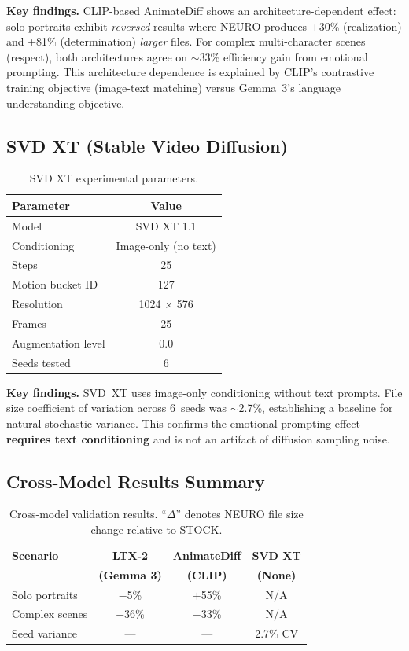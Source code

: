 \documentclass[10pt,twocolumn,letterpaper]{article}
\begin{document}
\textbf{Key findings.} CLIP-based AnimateDiff shows an architecture-dependent effect: solo portraits exhibit \emph{reversed} results where NEURO produces +30\% (realization) and +81\% (determination) \emph{larger} files. For complex multi-character scenes (respect), both architectures agree on $\sim$33\% efficiency gain from emotional prompting. This architecture dependence is explained by CLIP's contrastive training objective (image-text matching) versus Gemma~3's language understanding objective.

\subsection{SVD XT (Stable Video Diffusion)}

\begin{table}[h]
\centering
\small
\caption{SVD XT experimental parameters.}
\label{tab:svd_params}
\begin{tabular}{lc}
\toprule
\textbf{Parameter} & \textbf{Value} \\
\midrule
Model & SVD XT 1.1 \\
Conditioning & Image-only (no text) \\
Steps & 25 \\
Motion bucket ID & 127 \\
Resolution & 1024 $\times$ 576 \\
Frames & 25 \\
Augmentation level & 0.0 \\
Seeds tested & 6 \\
\bottomrule
\end{tabular}
\end{table}

\textbf{Key findings.} SVD~XT uses image-only conditioning without text prompts. File size coefficient of variation across 6~seeds was $\sim$2.7\%, establishing a baseline for natural stochastic variance. This confirms the emotional prompting effect \textbf{requires text conditioning} and is not an artifact of diffusion sampling noise.

\subsection{Cross-Model Results Summary}

\begin{table}[h]
\centering
\small
\caption{Cross-model validation results. ``$\Delta$'' denotes NEURO file size change relative to STOCK.}
\label{tab:crossmodel_params}
\begin{tabular}{lccc}
\toprule
\textbf{Scenario} & \textbf{LTX-2} & \textbf{AnimateDiff} & \textbf{SVD XT} \\
 & \textbf{(Gemma 3)} & \textbf{(CLIP)} & \textbf{(None)} \\
\midrule
Solo portraits & $-$5\% & $+$55\% & N/A \\
Complex scenes & $-$36\% & $-$33\% & N/A \\
Seed variance & --- & --- & 2.7\% CV \\
\bottomrule
\end{tabular}
\end{table}
\end{document}
